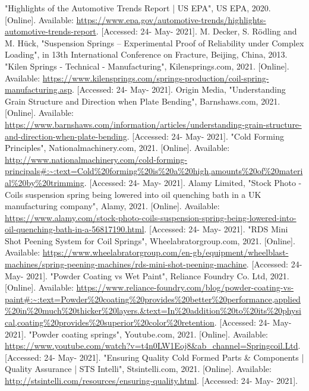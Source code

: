 \documentclass[11pt]{article}
\begin{document}
\begin{thebibliography}{00}
     "Highlights of the Automotive Trends Report | US EPA", US EPA, 2020. [Online]. Available: \url{https://www.epa.gov/automotive-trends/highlights-automotive-trends-report}. [Accessed: 24- May- 2021].
	 M. Decker, S. Rödling and M. Hück, "Suspension Springs – Experimental Proof of Reliability under Complex Loading", in 13th International Conference on Fracture, Beijing, China, 2013.
	 "Kilen Springs - Technical - Manufacturing", Kilensprings.com, 2021. [Online]. Available: \url{https://www.kilensprings.com/springs-production/coil-spring-manufacturing.asp}. [Accessed: 24- May- 2021].
	 Origin Media, "Understanding Grain Structure and Direction when Plate Bending", Barnshaws.com, 2021. [Online]. Available: \url{https://www.barnshaws.com/information/articles/understanding-grain-structure-and-direction-when-plate-bending}. [Accessed: 24- May- 2021].
	 "Cold Forming Principles", Nationalmachinery.com, 2021. [Online]. Available: \url{http://www.nationalmachinery.com/cold-forming-principals#:~:text=Cold\%20forming\%20is\%20a\%20high,amounts\%20of\%20material\%20by\%20trimming}. [Accessed: 24- May- 2021].
	 Alamy Limited, "Stock Photo - Coils suspension spring being lowered into oil quenching bath in a UK manufacturing company", Alamy, 2021. [Online]. Available: \url{https://www.alamy.com/stock-photo-coils-suspension-spring-being-lowered-into-oil-quenching-bath-in-a-56817190.html}. [Accessed: 24- May- 2021].
	 "RDS Mini Shot Peening System for Coil Springs", Wheelabratorgroup.com, 2021. [Online]. Available: \url{https://www.wheelabratorgroup.com/en-gb/equipment/wheelblast-machines/spring-peening-machines/rds-mini-shot-peening-machine}. [Accessed: 24- May- 2021].
	 "Powder Coating vs Wet Paint", Reliance Foundry Co. Ltd, 2021. [Online]. Available: \url{https://www.reliance-foundry.com/blog/powder-coating-vs-paint#:~:text=Powder\%20coating\%20provides\%20better\%20performance,applied\%20in\%20much\%20thicker\%20layers.&text=In\%20addition\%20to\%20its\%20physical,coating\%20provides\%20superior\%20color\%20retention}. [Accessed: 24- May- 2021].
	 "Powder coating springs", Youtube.com, 2021. [Online]. Available: \url{https://www.youtube.com/watch?v=t4n0LW1Eoj8&ab_channel=Springcoil.Ltd}. [Accessed: 24- May- 2021].
	 "Ensuring Quality Cold Formed Parts \& Components | Quality Assurance | STS Intelli", Stsintelli.com, 2021. [Online]. Available: \url{http://stsintelli.com/resources/ensuring-quality.html}. [Accessed: 24- May- 2021].

\end{thebibliography}
\end{document}
